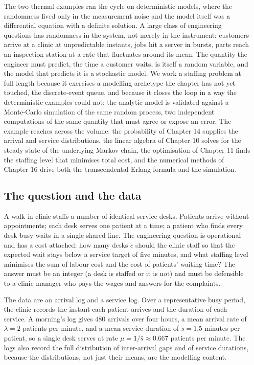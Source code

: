The two thermal examples ran the cycle on deterministic models, where the
randomness lived only in the measurement noise and the model itself was a
differential equation with a definite solution. A large class of
engineering questions has randomness in the system, not merely in the
instrument: customers arrive at a clinic at unpredictable instants, jobs
hit a server in bursts, parts reach an inspection station at a rate that
fluctuates around its mean. The quantity the engineer must predict, the
time a customer waits, is itself a random variable, and the model that
predicts it is a stochastic model. We work a staffing problem at full
length because it exercises a modelling archetype the chapter has not yet
touched, the discrete-event queue, and because it closes the loop in a way
the deterministic examples could not: the analytic model is validated
against a Monte-Carlo simulation of the same random process, two
independent computations of the same quantity that must agree or expose an
error. The example reaches across the volume: the probability of Chapter
14 supplies the arrival and service distributions, the linear algebra of
Chapter 10 solves for the steady state of the underlying Markov chain, the
optimisation of Chapter 11 finds the staffing level that minimises total
cost, and the numerical methods of Chapter 16 drive both the
transcendental Erlang formula and the simulation.

\subsection{The question and the data}

A walk-in clinic staffs a number of identical service desks. Patients
arrive without appointments; each desk serves one patient at a time; a
patient who finds every desk busy waits in a single shared line. The
engineering question is operational and has a cost attached: how many
desks $c$ should the clinic staff so that the expected wait stays below a
service target of five minutes, and what staffing level minimises the sum
of labour cost and the cost of patients' waiting time? The answer must be
an integer (a desk is staffed or it is not) and must be defensible to a
clinic manager who pays the wages and answers for the complaints.

The data are an arrival log and a service log. Over a representative busy
period, the clinic records the instant each patient arrives and the
duration of each service. A morning's log gives $480$ arrivals over four
hours, a mean arrival rate of $\lambda = 2$ patients per minute, and a
mean service duration of $\bar s = 1.5$ minutes per patient, so a single
desk serves at rate $\mu = 1/\bar s \approx 0.667$ patients per minute.
The logs also record the full distribution of inter-arrival gaps and of
service durations, because the distributions, not just their means, are
the modelling content.

